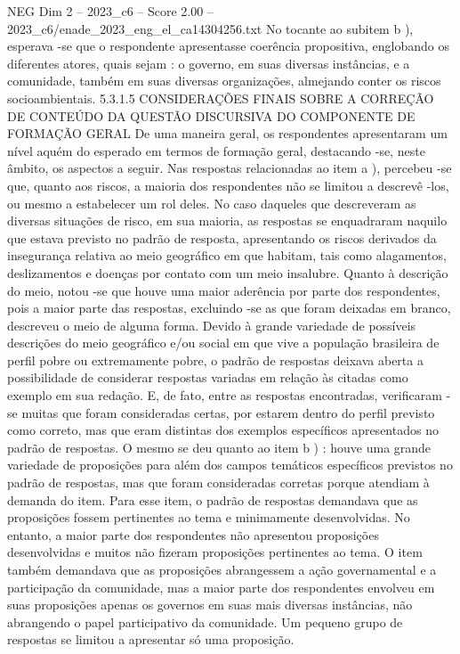 \begin{textsample}{NEG Dim 2 – 2023\_c6 – Score 2.00 – 2023\_c6/enade\_2023\_eng\_el\_ca14304256.txt}
No tocante ao subitem b ), esperava -se que o respondente apresentasse coerência propositiva, englobando os diferentes atores, quais sejam : o governo, em suas diversas instâncias, e a comunidade, também em suas diversas organizações, almejando conter os riscos socioambientais. 5.3.1.5 CONSIDERAÇÕES FINAIS SOBRE A CORREÇÃO DE CONTEÚDO DA QUESTÃO DISCURSIVA DO COMPONENTE DE FORMAÇÃO GERAL De uma maneira geral, os respondentes apresentaram um nível aquém do esperado em termos de formação geral, destacando -se, neste âmbito, os aspectos a seguir.
Nas respostas relacionadas ao item a ), percebeu -se que, quanto aos riscos, a maioria dos respondentes não se limitou a descrevê -los, ou mesmo a estabelecer um rol deles.
No caso daqueles que descreveram as diversas situações de risco, em sua maioria, as respostas se enquadraram naquilo que estava previsto no padrão de resposta, apresentando os riscos derivados da insegurança relativa ao meio geográfico em que habitam, tais como alagamentos, deslizamentos e doenças por contato com um meio insalubre.
Quanto à descrição do meio, notou -se que houve uma maior aderência por parte dos respondentes, pois a maior parte das respostas, excluindo -se as que foram deixadas em branco, descreveu o meio de alguma forma.
Devido à grande variedade de possíveis descrições do meio geográfico e/ou social em que vive a população brasileira de perfil pobre ou extremamente pobre, o padrão de respostas deixava aberta a possibilidade de considerar respostas variadas em relação às citadas como exemplo em sua redação.
E, de fato, entre as respostas encontradas, verificaram -se muitas que foram consideradas certas, por estarem dentro do perfil previsto como correto, mas que eram distintas dos exemplos específicos apresentados no padrão de respostas.
O mesmo se deu quanto ao item b ) : houve uma grande variedade de proposições para além dos campos temáticos específicos previstos no padrão de respostas, mas que foram consideradas corretas porque atendiam à demanda do item.
Para esse item, o padrão de respostas demandava que as proposições fossem pertinentes ao tema e minimamente desenvolvidas.
No entanto, a maior parte dos respondentes não apresentou proposições desenvolvidas e muitos não fizeram proposições pertinentes ao tema.
O item também demandava que as proposições abrangessem a ação governamental e a participação da comunidade, mas a maior parte dos respondentes envolveu em suas proposições apenas os governos em suas mais diversas instâncias, não abrangendo o papel participativo da comunidade.
Um pequeno grupo de respostas se limitou a apresentar só uma proposição.

\end{textsample}
